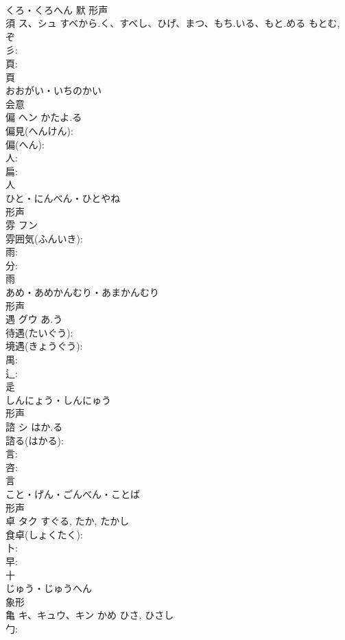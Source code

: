 \documentclass[8pt]{extreport}
\begin{document}
\begin{CJK}{UTF8}{min}
\\	くろ・くろへん	默	形声 
\\	須	ス、シュ	すべから.く、すべし、ひげ、まつ、もち.いる、もと.める	もとむ, ぞ	
\\	彡: 
\\	頁: 
\\	頁	
\\	おおがい・いちのかい	
\\	会意 
\\	偏	ヘン	かたよ.る		
\\	偏見(へんけん): 
\\	偏(へん): 
\\	人: 
\\	扁: 
\\	人	
\\	ひと・にんべん・ひとやね	
\\	形声 
\\	雰	フン			
\\	雰囲気(ふんいき): 
\\	雨: 
\\	分: 
\\	雨	
\\	あめ・あめかんむり・あまかんむり	
\\	形声 
\\	遇	グウ	あ.う		
\\	待遇(たいぐう): 
\\	境遇(きょうぐう): 
\\	禺: 
\\	辶: 
\\	辵	
\\	しんにょう・しんにゅう	
\\	形声 
\\	諮	シ	はか.る		
\\	諮る(はかる): 
\\	言: 
\\	咨: 
\\	言	
\\	こと・げん・ごんべん・ことば	
\\	形声 
\\	卓	タク		すぐる, たか, たかし	
\\	食卓(しょくたく): 
\\	卜: 
\\	早: 
\\	十	
\\	じゅう・じゅうへん	
\\	象形 
\\	亀	キ、キュウ、キン	かめ	ひさ, ひさし	
\\	勹: 

\end{CJK}
\end{document}

